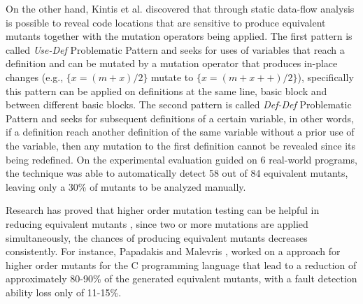 On the other hand, Kintis et al. \cite{kintis2014using,kintis2015medic} discovered that through static data-flow analysis is possible to reveal code locations that are sensitive to produce equivalent mutants together with the mutation operators being applied. The first pattern is called \textit{Use-Def} Problematic Pattern and seeks for uses of variables that reach a definition and can be mutated by a mutation operator that produces in-place changes (e.g., $\{x = (m + x)/2\}$ mutate to $\{x = (m + x++)/2\}$), specifically this pattern can be applied on definitions at the same line, basic block and between different basic blocks. The second pattern is called \textit{Def-Def} Problematic Pattern and seeks for subsequent definitions of a certain variable, in other words, if a definition reach another definition of the same variable without a prior use of the variable, then any mutation to the first definition cannot be revealed since its being redefined. On the experimental evaluation guided on 6 real-world programs, the technique was able to automatically detect 58 out of 84 equivalent mutants, leaving only a 30\% of mutants to be analyzed manually.

Research has proved that higher order mutation testing can be helpful in reducing equivalent mutants \cite{jia2009higher,kintis2010evaluating,offutt1992investigations,papadakis2010empirical}, since two or more mutations are applied simultaneously, the chances of producing equivalent mutants decreases consistently. For instance, Papadakis and Malevris \cite{papadakis2010empirical}, worked on a approach for higher order mutants for the C programming language that lead to a reduction of approximately 80-90\% of the generated equivalent mutants, with a fault detection ability loss only of 11-15\%. 


